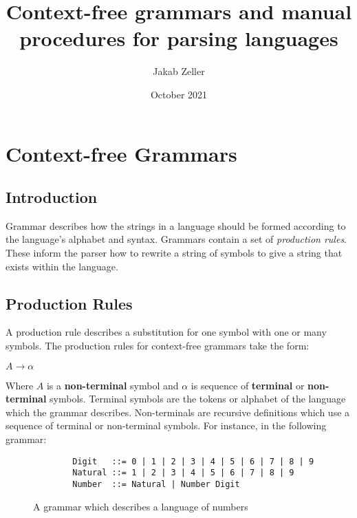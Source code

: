 \documentclass[12pt, letterpaper]{article}
\title{Context-free grammars and manual procedures for parsing languages}
\author{Jakab Zeller}
\date{October 2021}
\theoremstyle{definition}
\begin{document}
\maketitle

\section{Context-free Grammars}

\subsection{Introduction}

Grammar describes how the strings in a language should be formed according to the language's alphabet and syntax. Grammars contain a set of \textit{production rules}. These inform the parser how to rewrite a string of symbols to give a string that exists within the language.

\subsection{Production Rules}

A production rule describes a substitution for one symbol with one or many symbols. The production rules for context-free grammars take the form:

\begin{center}
    $A \rightarrow \alpha$
\end{center}

Where $A$ is a \textbf{non-terminal} symbol and $\alpha$ is sequence of \textbf{terminal} or \textbf{non-terminal} symbols. Terminal symbols are the tokens or alphabet of the language which the grammar describes. Non-terminals are recursive definitions which use a sequence of terminal or non-terminal symbols. For instance, in the following grammar:

\begin{figure}[h]
    \begin{center}    
        \begin{verbatim}
        Digit   ::= 0 | 1 | 2 | 3 | 4 | 5 | 6 | 7 | 8 | 9
        Natural ::= 1 | 2 | 3 | 4 | 5 | 6 | 7 | 8 | 9
        Number  ::= Natural | Number Digit
        \end{verbatim}
        \vspace{-1.5em}
    \end{center}
    \caption{A grammar which describes a language of numbers}
\end{figure}
\end{document}
